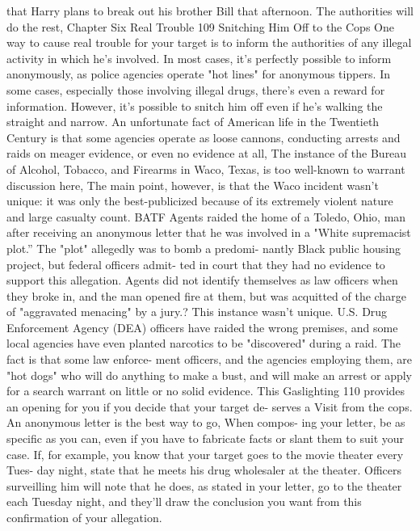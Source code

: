 \documentclass{book}
\begin{document}
that Harry plans to break out his brother Bill that afternoon. 
The authorities will do the rest, 
Chapter Six 
Real Trouble 
109 
Snitching Him Off to the Cops 
One way to cause real trouble for your target is to inform 
the authorities of any illegal activity in which he's involved. In 
most cases, it's perfectly possible to inform anonymously, as 
police agencies operate "hot lines" for anonymous tippers. In 
some cases, especially those involving illegal drugs, there's 
even a reward for information. 
However, it's possible to snitch him off even if he's walking 
the straight and narrow. An unfortunate fact of American life in 
the Twentieth Century is that some agencies operate as loose 
cannons, conducting arrests and raids on meager evidence, or 
even no evidence at all, The instance of the Bureau of Alcohol, 
Tobacco, and Firearms in Waco, Texas, is too well-known to 
warrant discussion here, The main point, however, is that the 
Waco incident wasn't unique: it was only the best-publicized 
because of its extremely violent nature and large casualty count. 
BATF Agents raided the home of a Toledo, Ohio, man after 
receiving an anonymous letter that he was involved in a "White 
supremacist plot.” The "plot" allegedly was to bomb a predomi- 
nantly Black public housing project, but federal officers admit- 
ted in court that they had no evidence to support this allegation. 
Agents did not identify themselves as law officers when they 
broke in, and the man opened fire at them, but was acquitted of 
the charge of "aggravated menacing" by a jury.? 
This instance wasn't unique. U.S. Drug Enforcement 
Agency (DEA) officers have raided the wrong premises, and 
some local agencies have even planted narcotics to be 
"discovered" during a raid. The fact is that some law enforce- 
ment officers, and the agencies employing them, are "hot dogs" 
who will do anything to make a bust, and will make an arrest or 
apply for a search warrant on little or no solid evidence. This  Gaslighting 
110 
provides an opening for you if you decide that your target de- 
serves a Visit from the cops. 
An anonymous letter is the best way to go, When compos- 
ing your letter, be as specific as you can, even if you have to 
fabricate facts or slant them to suit your case. If, for example, 
you know that your target goes to the movie theater every Tues- 
day night, state that he meets his drug wholesaler at the theater. 
Officers surveilling him will note that he does, as stated in your 
letter, go to the theater each Tuesday night, and they'll draw the 
conclusion you want from this confirmation of your allegation. 
\end{document}
